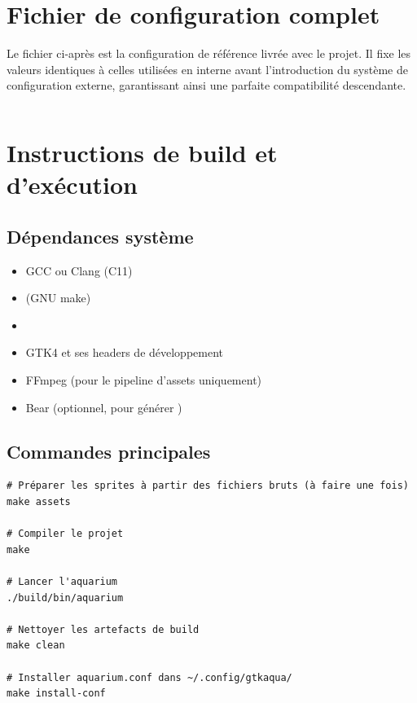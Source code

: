\chapter{Fichier de configuration complet}
\label{ann:conf}

Le fichier ci-après est la configuration de référence livrée
avec le projet. Il fixe les valeurs identiques à celles utilisées
en interne avant l'introduction du système de configuration
externe, garantissant ainsi une parfaite compatibilité
descendante.

\inputminted[fontsize=\scriptsize, frame=lines, linenos, breaklines]{toml}{../aquarium.conf}

\chapter{Instructions de build et d'exécution}
\label{ann:build}

\section{Dépendances système}

\begin{itemize}
  \item GCC ou Clang (C11)
  \item {} (GNU make)
  \item {}
  \item GTK4 et ses headers de développement
  \item FFmpeg (pour le pipeline d'assets uniquement)
  \item Bear (optionnel, pour générer )
\end{itemize}

\section{Commandes principales}

\begin{verbatim}
# Préparer les sprites à partir des fichiers bruts (à faire une fois)
make assets

# Compiler le projet
make

# Lancer l'aquarium
./build/bin/aquarium

# Nettoyer les artefacts de build
make clean

# Installer aquarium.conf dans ~/.config/gtkaqua/
make install-conf
\end{verbatim}

